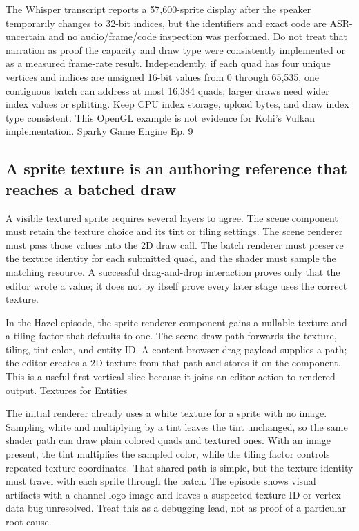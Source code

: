 The Whisper transcript reports a 57,600-sprite display after the speaker temporarily changes to 32-bit indices, but the identifiers and exact code are ASR-uncertain and no audio/frame/code inspection was performed. Do not treat that narration as proof the capacity and draw type were consistently implemented or as a measured frame-rate result. Independently, if each quad has four unique vertices and indices are unsigned 16-bit values from 0 through 65,535, one contiguous batch can address at most 16,384 quads; larger draws need wider index values or splitting. Keep CPU index storage, upload bytes, and draw index type consistent. This OpenGL example is not evidence for Kohi's Vulkan implementation. \href{https://www.youtube.com/watch?v=ImtWD_9OAeY}{Sparky Game Engine Ep. 9}

\subsection{A sprite texture is an authoring reference that reaches a batched draw}\label{06-engine-ii-ch026-a-sprite-texture-is-an-authoring-reference-that-reaches-a-batched-draw}

\hypertarget{06-engine-ii-ch026-a-sprite-texture-is-an-authoring-reference-that-reaches-a-batched-draw}{}

A visible textured sprite requires several layers to agree. The scene component must retain the texture choice and its tint or tiling settings. The scene renderer must pass those values into the 2D draw call. The batch renderer must preserve the texture identity for each submitted quad, and the shader must sample the matching resource. A successful drag-and-drop interaction proves only that the editor wrote a value; it does not by itself prove every later stage uses the correct texture.

In the Hazel episode, the sprite-renderer component gains a nullable texture and a tiling factor that defaults to one. The scene draw path forwards the texture, tiling, tint color, and entity ID. A content-browser drag payload supplies a path; the editor creates a 2D texture from that path and stores it on the component. This is a useful first vertical slice because it joins an editor action to rendered output. \href{https://www.youtube.com/watch?v=woSa-ZMJl-Q}{Textures for Entities}

The initial renderer already uses a white texture for a sprite with no image. Sampling white and multiplying by a tint leaves the tint unchanged, so the same shader path can draw plain colored quads and textured ones. With an image present, the tint multiplies the sampled color, while the tiling factor controls repeated texture coordinates. That shared path is simple, but the texture identity must travel with each sprite through the batch. The episode shows visual artifacts with a channel-logo image and leaves a suspected texture-ID or vertex-data bug unresolved. Treat this as a debugging lead, not as proof of a particular root cause.

